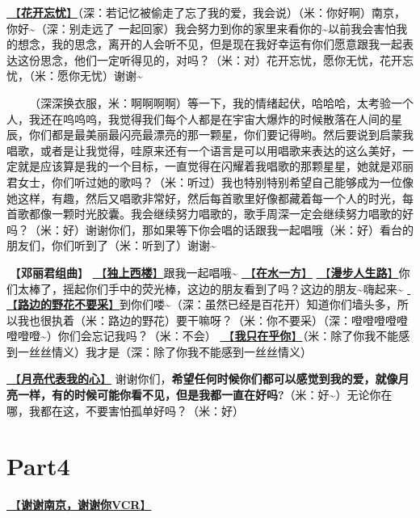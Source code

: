 \documentclass[]{ctexbook}
\begin{document}
\hyperref[no-worries]{🎵【\textbf{花开忘忧}】}（深：若记忆被偷走了忘了我的爱，我会说）（米：你好啊）南京，你好\textasciitilde（深：别走远了 一起回家）我会努力到你的家里来看你的\textasciitilde 以前我会害怕我的想念，我的思念，离开的人会听不见，但是现在我好幸运有你们愿意跟我一起表达这份思念，他们一定听得见的，对吗？（米：对）花开忘忧，愿你无忧，花开忘忧，（米：愿你无忧）谢谢\textasciitilde{}

  （深深换衣服，米：啊啊啊啊）等一下，我的情绪起伏，哈哈哈，太考验一个人，我还在呜呜呜，我觉得我们每个人都是在宇宙大爆炸的时候散落在人间的星辰，你们都是最美丽最闪亮最漂亮的那一颗星，你们要记得哟。然后要说到启蒙我唱歌，或者是让我觉得，哇原来还有一个语言是可以用唱歌来表达的这么美好，一定就是应该算是我的一个目标，一直觉得在闪耀着我唱歌的那颗星星，她就是邓丽君女士，你们听过她的歌吗？（米：听过）我也特别特别希望自己能够成为一位像她这样，有趣，然后又唱歌非常好，然后每首歌里好像都藏着每一个人的时光，每首歌都像一颗时光胶囊。我会继续努力唱歌的，歌手周深一定会继续努力唱歌的好吗？（米：好）谢谢你们，那如果等下你会唱的话跟我一起唱哦（米：好）看台的朋友们，你们听到了（米：听到了）谢谢\textasciitilde{}

🎵【\textbf{邓丽君组曲}】
\hyperref[one-in-the-building]{🎵【\textbf{独上西楼}】}跟我一起唱哦\textasciitilde{}
\hyperref[on-the-water-side]{🎵【\textbf{在水一方}】}
\hyperref[walk-the-road-of-life]{🎵【\textbf{漫步人生路}】}你们太棒了，摇起你们手中的荧光棒，这边的朋友看到了吗？这边的朋友\textasciitilde 嗨起来\textasciitilde{}
\hyperref[only-with-me]{🎵【\textbf{路边的野花不要采}】}到你们喽\textasciitilde（深：虽然已经是百花开）知道你们墙头多，所以我也很执着（米：路边的野花）要干嘛呀？（米：你不要采）（深：噔噔噔噔噔噔噔噔\textasciitilde）你们会忘记我吗？（米：不会）
\hyperref[only-you]{🎵【\textbf{我只在乎你}】}（米：除了你我不能感到一丝丝情义）我才是（深：除了你我不能感到一丝丝情义）

\hyperref[my-heart-is-moon]{🎵【\textbf{月亮代表我的心}】} 谢谢你们，\textbf{希望任何时候你们都可以感觉到我的爱，就像月亮一样，有的时候可能你看不见，但是我都一直在好吗?}（米：好\textasciitilde）无论你在哪，我都在这，不要害怕孤单好吗？（米：好）

\section{Part4}\label{nanjing-20240811-part4}

\hyperref[thank-you-vcr]{🎥【\textbf{谢谢南京，谢谢你VCR}】}
\end{document}
